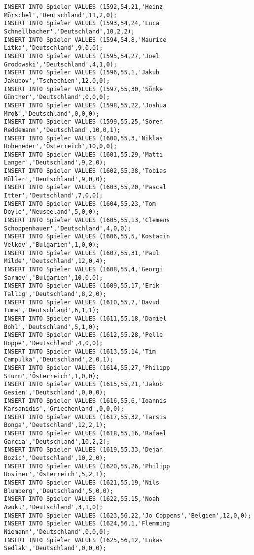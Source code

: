 \documentclass{bschlangaul-aufgabe}
\begin{document}
\begin{verbatim}
INSERT INTO Spieler VALUES (1592,54,21,'Heinz Mörschel','Deutschland',11,2,0);
INSERT INTO Spieler VALUES (1593,54,24,'Luca Schnellbacher','Deutschland',10,2,2);
INSERT INTO Spieler VALUES (1594,54,8,'Maurice Litka','Deutschland',9,0,0);
INSERT INTO Spieler VALUES (1595,54,27,'Joel Grodowski','Deutschland',4,1,0);
INSERT INTO Spieler VALUES (1596,55,1,'Jakub Jakubov','Tschechien',12,0,0);
INSERT INTO Spieler VALUES (1597,55,30,'Sönke Günther','Deutschland',0,0,0);
INSERT INTO Spieler VALUES (1598,55,22,'Joshua Mroß','Deutschland',0,0,0);
INSERT INTO Spieler VALUES (1599,55,25,'Sören Reddemann','Deutschland',10,0,1);
INSERT INTO Spieler VALUES (1600,55,3,'Niklas Hoheneder','Österreich',10,0,0);
INSERT INTO Spieler VALUES (1601,55,29,'Matti Langer','Deutschland',9,2,0);
INSERT INTO Spieler VALUES (1602,55,38,'Tobias Müller','Deutschland',9,0,0);
INSERT INTO Spieler VALUES (1603,55,20,'Pascal Itter','Deutschland',7,0,0);
INSERT INTO Spieler VALUES (1604,55,23,'Tom Doyle','Neuseeland',5,0,0);
INSERT INTO Spieler VALUES (1605,55,13,'Clemens Schoppenhauer','Deutschland',4,0,0);
INSERT INTO Spieler VALUES (1606,55,5,'Kostadin Velkov','Bulgarien',1,0,0);
INSERT INTO Spieler VALUES (1607,55,31,'Paul Milde','Deutschland',12,0,4);
INSERT INTO Spieler VALUES (1608,55,4,'Georgi Sarmov','Bulgarien',10,0,0);
INSERT INTO Spieler VALUES (1609,55,17,'Erik Tallig','Deutschland',8,2,0);
INSERT INTO Spieler VALUES (1610,55,7,'Davud Tuma','Deutschland',6,1,1);
INSERT INTO Spieler VALUES (1611,55,18,'Daniel Bohl','Deutschland',5,1,0);
INSERT INTO Spieler VALUES (1612,55,28,'Pelle Hoppe','Deutschland',4,0,0);
INSERT INTO Spieler VALUES (1613,55,14,'Tim Campulka','Deutschland',2,0,1);
INSERT INTO Spieler VALUES (1614,55,27,'Philipp Sturm','Österreich',1,0,0);
INSERT INTO Spieler VALUES (1615,55,21,'Jakob Gesien','Deutschland',0,0,0);
INSERT INTO Spieler VALUES (1616,55,6,'Ioannis Karsanidis','Griechenland',0,0,0);
INSERT INTO Spieler VALUES (1617,55,32,'Tarsis Bonga','Deutschland',12,2,1);
INSERT INTO Spieler VALUES (1618,55,16,'Rafael García','Deutschland',10,2,2);
INSERT INTO Spieler VALUES (1619,55,33,'Dejan Bozic','Deutschland',10,2,0);
INSERT INTO Spieler VALUES (1620,55,26,'Philipp Hosiner','Österreich',5,2,1);
INSERT INTO Spieler VALUES (1621,55,19,'Nils Blumberg','Deutschland',5,0,0);
INSERT INTO Spieler VALUES (1622,55,15,'Noah Awuku','Deutschland',3,1,0);
INSERT INTO Spieler VALUES (1623,56,22,'Jo Coppens','Belgien',12,0,0);
INSERT INTO Spieler VALUES (1624,56,1,'Flemming Niemann','Deutschland',0,0,0);
INSERT INTO Spieler VALUES (1625,56,12,'Lukas Sedlak','Deutschland',0,0,0);

\end{verbatim}
\end{document}
